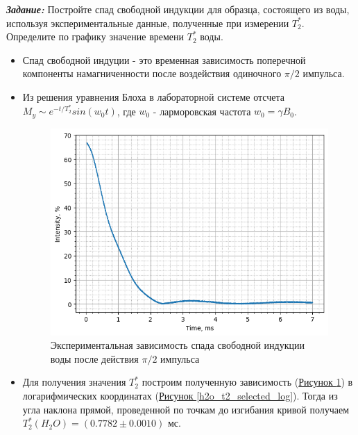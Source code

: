 \documentclass{article}
\begin{document}
\textbf{\textit{Задание:}} Постройте спад свободной индукции для образца, состоящего из воды, используя экспериментальные данные, полученные при измерении $T_2^*$. Определите по графику значение времени $T_2^*$ воды.
\\ \par
\begin{itemize}


\item Спад свободной индуции - это временная зависимость поперечной компоненты намагниченности после воздействия одиночного $\pi/2$ импульса.

\item Из решения уравнения Блоха в лабораторной системе отсчета $M_y \sim e^{-t/T_2^*}sin(w_0t)$, где $w_0$ - ларморовская частота $w_0=\gamma B_0$.

\begin{figure}[h!]
    \centering
    \includegraphics[scale = 0.7]{graphs/h2o_t2_selected.png}
    \caption{Экспериментальная зависимость спада свободной индукции воды после действия $\pi/2$ импульса}
    \label{h2o_t2_selected}
\end{figure}

\item  Для получения значения $T_2^{*}$ построим полученную зависимость (\hyperref[h2o_t2_selected]{Рисунок \ref*{h2o_t2_selected}}) в логарифмических координатах (\hyperref[h2o_t2_selected_log]{Рисунок \ref*{h2o_t2_selected_log}}). Тогда из угла наклона прямой, проведенной по точкам до изгибания кривой получаем $T_2^{*}(H_2O)=(0.7782\pm0.0010)$ мс.



\end{itemize}
\end{document}
